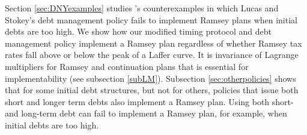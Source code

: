\documentclass[12pt]{article}
\newcommand{\WJ}[1]{{\textcolor{red}{#1}}}
\newcommand{\TS}[1]{{\textcolor{magenta}{#1}}}
\begin{document}
%
%
%

Section \ref{sec:DNYexamples} %
studies  \citeauthor{debortoli2021optimal}'s {counterexamples  in which Lucas and Stokey's debt management policy  fails to implement Ramsey plans when initial debts are too high.} 
We show  how our  modified timing protocol and debt management policy   implement a  Ramsey plan regardless of whether Ramsey tax rates fall above or below the peak of a Laffer curve.      {It is  invariance of Lagrange multipliers for Ramsey and continuation plans that is essential for implementability  (see subsection \ref{subLM}). Subsection \ref{sec:otherpolicies} shows that for some
initial debt structures, but not for others, policies that issue both 
short and  longer term debts  also implement a Ramsey plan. Using both short- and long-term debt can  fail to implement a Ramsey plan, for example, when  initial debts are too  high.}  %
\end{document}

